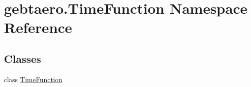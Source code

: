 \hypertarget{namespacegebtaero_1_1_time_function}{}\section{gebtaero.\+Time\+Function Namespace Reference}
\label{namespacegebtaero_1_1_time_function}
\subsection*{Classes}
\begin{DoxyCompactItemize}
\item 
class \hyperlink{classgebtaero_1_1_time_function_1_1_time_function}{Time\+Function}
\end{DoxyCompactItemize}
